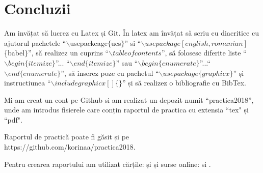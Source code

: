 \documentclass{report}
\begin{document}
\chapter{Concluzii}
\hspace*{0.3cm} Am invățat să lucrez cu Latex și Git. În latex am învățat să scriu cu diacritice cu ajutorul pachetele  ``$\backslash$usepackeage$\{$ucs$\}$'' si ``$\backslash usepackage[english,romanian]$\{babel$\}$'', să realizez un cuprins ``$\backslash tableofcontents$'', să folosesc diferite liste ``$\backslash begin\{itemize\}$''... ``$\backslash end\{itemize\}$'' sau ``$\backslash begin\{enumerate\}$''...``$\backslash end\{enumerate\}$'', să inserez poze cu pachetul ``$\backslash usepackage\{graphicx\}$'' și instructiunea ``$\backslash  includegraphicx[]\{\}$'' și să realizez o bibliografie cu BibTex.

Mi-am creat un cont pe Github si am realizat un depozit numit ``practica2018'', unde am introdus fisierele care conțin raportul de practica cu extensia ``tex" și ``pdf".

Raportul de practică poate fi găsit și pe https://github.com/korinaa/practica2018.

Pentru crearea raportului am utilizat cărțile: \cite{book:2}  și \cite{book:1} și surse online:  \cite{3} si \cite{4}. 

 
\newpage
 

\end{document}
